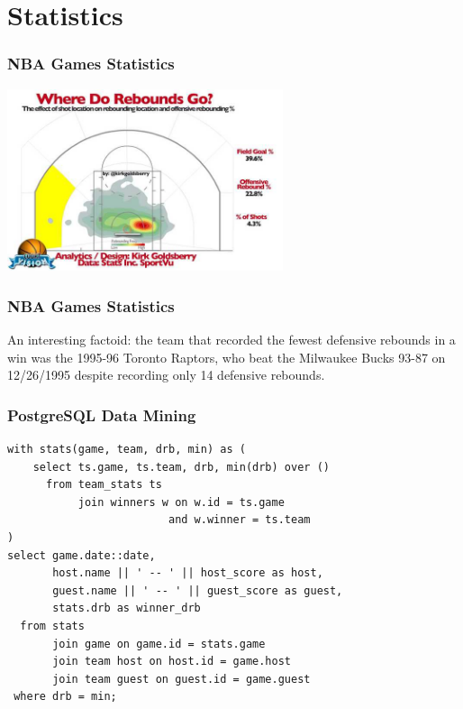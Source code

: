 \documentclass{beamer}
\begin{document}
\section{Statistics}

\begin{frame}
  \frametitle{NBA Games Statistics}

  \begin{center}
    \includegraphics[height=2.1in]{reboundsc1.jpg}
  \end{center}
\end{frame}

\begin{frame}
  \frametitle{NBA Games Statistics}

  An interesting factoid: the team that recorded the fewest defensive
  rebounds in a win was the 1995-96 Toronto Raptors, who beat the Milwaukee
  Bucks 93-87 on 12/26/1995 despite recording only 14 defensive rebounds.
\end{frame}

\begin{frame}[fragile]
  \frametitle{PostgreSQL Data Mining}

\begin{verbatim}
with stats(game, team, drb, min) as (
    select ts.game, ts.team, drb, min(drb) over ()
      from team_stats ts
           join winners w on w.id = ts.game
                         and w.winner = ts.team
)
select game.date::date,
       host.name || ' -- ' || host_score as host,
       guest.name || ' -- ' || guest_score as guest,
       stats.drb as winner_drb
  from stats
       join game on game.id = stats.game
       join team host on host.id = game.host
       join team guest on guest.id = game.guest
 where drb = min;
\end{verbatim}
\end{frame}
\end{document}
